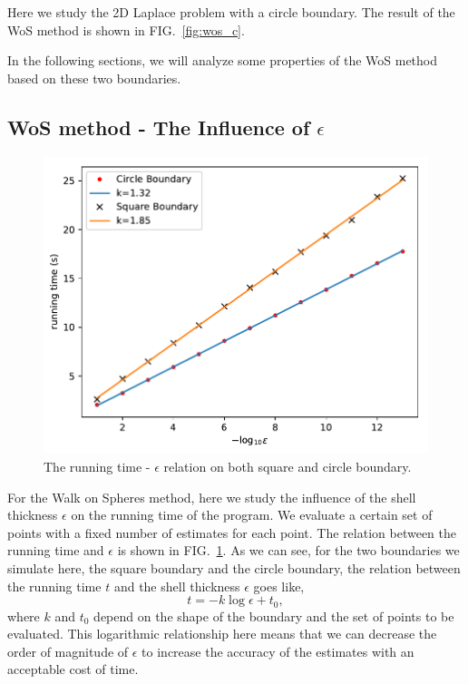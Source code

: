 \documentclass[aps, prl, preprint, groupedaddress]{revtex4-1}
\begin{document}
Here we study the 2D Laplace problem with a circle boundary. The result of the WoS method is shown in FIG.~\ref{fig:wos_c}.

In the following sections, we will analyze some properties of the WoS method based on these two boundaries.

\subsection{WoS method - The Influence of $\epsilon$}

\begin{figure}[htbp]
    \centering
    \includegraphics[width=.8\textwidth]{./figs/ep_t}
    \caption{\label{fig:ep_t} The running time - $\epsilon$ relation on both square and circle boundary.}
\end{figure}

For the Walk on Spheres method, here we study the influence of the shell thickness $\epsilon$ on the running time of the program. We evaluate a certain set of points with a fixed number of estimates for each point. The relation between the running time and $\epsilon$ is shown in FIG.~\ref{fig:ep_t}. As we can see, for the two boundaries we simulate here, the square boundary and the circle boundary, the relation between the running time $t$ and the shell thickness $\epsilon$ goes like,
\begin{equation}
    t = -k\log\epsilon + t_0,
\end{equation}
where $k$ and $t_0$ depend on the shape of the boundary and the set of points to be evaluated. This logarithmic relationship here means that we can decrease the order of magnitude of $\epsilon$ to increase the accuracy of the estimates with an acceptable cost of time.
\end{document}
